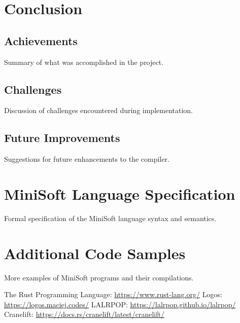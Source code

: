 \documentclass[12pt,a4paper]{article}
\begin{document}
\section{Conclusion}
\subsection{Achievements}
Summary of what was accomplished in the project.

\subsection{Challenges}
Discussion of challenges encountered during implementation.

\subsection{Future Improvements}
Suggestions for future enhancements to the compiler.

\appendix
\section{MiniSoft Language Specification}
Formal specification of the MiniSoft language syntax and semantics.

\section{Additional Code Samples}
More examples of MiniSoft programs and their compilations.

\begin{thebibliography}{9}
	 The Rust Programming Language: \url{https://www.rust-lang.org/}
	 Logos: \url{https://logos.maciej.codes/}
	 LALRPOP: \url{https://lalrpop.github.io/lalrpop/}
	 Cranelift: \url{https://docs.rs/cranelift/latest/cranelift/}
\end{thebibliography}
\end{document}
